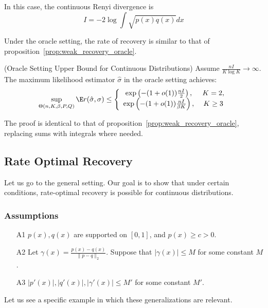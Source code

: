 \documentclass{article}
\begin{document}
In this case, the continuous Renyi divergence is 
\[
I = -2 \log \int \sqrt{p(x)q(x)} dx 
\]

Under the oracle setting, the rate of recovery is similar to that of proposition~\ref{prop:weak_recovery_oracle}. 
\begin{proposition} 
\label{prop:weak_recovery_oracle_continuous}
(Oracle Setting Upper Bound for Continuous Distributions)
Assume $\frac{n I}{K \log K} \rightarrow \infty$. The maximum likelihood estimator $\hat{\sigma}$ in the oracle setting achieves:
\[
\sup_{\Theta(n, K, \beta, P, Q)} \E r(\hat{\sigma}, \sigma) \leq \left\{ 
    \begin{array}{cc} 
   \exp \left( - (1 + o(1)) \frac{nI}{2} \right ), \, & K=2, \\
   \exp \left( - (1 + o(1)) \frac{nI}{\beta K} \right ), \,& K\geq 3
  \end{array} \right. 
\]   
\end{proposition}
The proof is identical to that of proposition~\ref{prop:weak_recovery_oracle}, replacing sums with integrals where needed. 


\subsection{Rate Optimal Recovery}

Let us go to the general setting. Our goal is to show that under certain conditions, rate-optimal recovery is possible for continuous distributions.

\subsubsection{Assumptions}
\label{sec:continuous_assumptions}

\begin{enumerate}
\item[A1] $p(x), q(x)$ are supported on $[0,1]$, and $p(x) \geq c > 0$. 
\item[A2] Let $\gamma(x) = \frac{p(x) - q(x)}{\| p - q \|_2}$. Suppose that $|\gamma(x)| \leq M$ for some constant $M$. 
\item[A3] $|p'(x)|, |q'(x)|, |\gamma'(x)| \leq M'$ for some constant $M'$. 
\end{enumerate}


Let us see a specific example in which these generalizations are relevant. 
\end{document}
